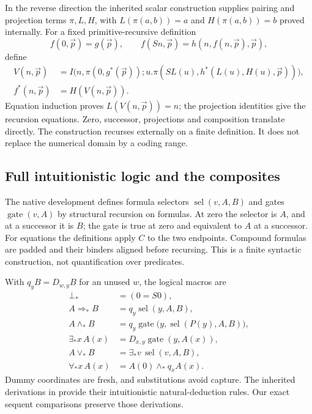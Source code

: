In the reverse direction the inherited scalar construction supplies
pairing and projection terms $\pi,L,H$, with
$L(\pi(a,b))=a$ and $H(\pi(a,b))=b$ proved internally.
For a fixed primitive-recursive definition
\[
 f(0,\vec p)=g(\vec p),\qquad
 f(Sn,\vec p)=h(n,f(n,\vec p),\vec p),
\]
define
\[
\begin{split}
 V(n,\vec p)&=I\bigl(n,\pi(0,g^*(\vec p));
       u.\pi(SL(u),h^*(L(u),H(u),\vec p))\bigr),\\
 f^*(n,\vec p)&=H(V(n,\vec p)).
\end{split}
\]
Equation induction proves $L(V(n,\vec p))=n$; the projection identities
give the recursion equations. Zero, successor, projections and composition
translate directly. The construction recurses externally on a finite
definition. It does not replace the numerical domain by a coding range.

\subsection{Full intuitionistic logic and the composites}

The native development defines formula selectors $\operatorname{sel}(v,A,B)$
and gates $\operatorname{gate}(v,A)$ by structural recursion on formulas.
At zero the selector is $A$, and at a successor it is $B$; the gate is
true at zero and equivalent to $A$ at a successor. For equations the
definitions apply $C$ to the two endpoints. Compound formulas are padded
and their binders aligned before recursing. This is a finite syntactic
construction, not quantification over predicates.

With $q_yB=D_{w,y}B$ for an unused $w$, the logical macros are
\[
\begin{aligned}
 \bot_*&=(0=S0),\\
 A\Rightarrow_*B&=q_y\operatorname{sel}(y,A,B),\\
 A\wedge_*B&=q_y\operatorname{gate}
          \bigl(y,\operatorname{sel}(P(y),A,B)\bigr),\\
 \exists_*x\,A(x)&=D_{x,y}\operatorname{gate}(y,A(x)),\\
 A\vee_*B&=\exists_*v\,\operatorname{sel}(v,A,B),\\
 \forall_*x\,A(x)&=A(0)\wedge_*q_xA(x).
\end{aligned}
\]
Dummy coordinates are fresh, and substitutions avoid capture.
The inherited derivations in 
provide their intuitionistic natural-deduction rules. Our exact sequent
comparisons preserve those derivations.

